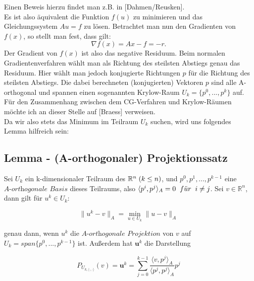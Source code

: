 Einen Beweis hierzu findet man z.B. in [Dahmen/Reusken].\\
Es ist also äquivalent die Funktion $f(u)$ zu minimieren und das Gleichungssystem $Au = f$ zu lösen. Betrachtet man nun den Gradienten von $f(x)$, so stellt man fest, dass gilt:
\begin{equation}
\nabla f(x) = Ax - f = -r.
\end{equation}
Der Gradient von $f(x)$ ist also das negative Residuum. Beim normalen Gradientenverfahren wählt man als Richtung des steilsten Abstiegs genau das Residuum. Hier wählt man jedoch konjugierte Richtungen $p$ für die Richtung des steilsten Abstiegs. Die dabei berechneten (konjugierten) Vektoren $p$ sind alle A-orthogonal und spannen einen sogenannten Krylow-Raum $U_{k} = \{p^{0},...,p^{k}\}$ auf. Für den Zusammenhang zwischen dem CG-Verfahren und Krylow-Räumen möchte ich an dieser Stelle auf [Braess] verweisen.\\
Da wir also stets das Minimum im Teilraum $U_{k}$ suchen, wird uns folgendes Lemma hilfreich sein:


\subsection{Lemma - (A-orthogonaler) Projektionssatz}\label{s.Projektionssatz}

Sei $U_{k}$ ein k-dimensionaler Teilraum des $\mathbb{R}^{n} \hspace{1mm} (k \le n)$, und $p^{0}, p^{1},...,p^{k-1}$ eine $\textit{A-orthogonale Basis}$ dieses Teilraums, also $\langle p^{i}, p^{j} \rangle _{A} = 0 \hspace{2mm} f\ddot{u}r \hspace{2mm} i \ne j$. Sei $v \in \mathbb{R}^{n}$, dann gilt für $u^{k} \in U_{k}$:

\begin{equation}
\|u^{k} - v\|_{A} = \underset{u \in U_{k}}{\min} \|u - v\|_{A}
\end{equation}

genau dann, wenn $u^{k}$ die $\textit{A-orthogonale Projektion}$ von $v$ auf $U_{k} = span\{p^{0},...,p^{k-1}\}$ ist. Außerdem hat $\textbf{u}^{k}$ die Darstellung

\begin{equation}
P_{U_{k,\langle \cdot,\cdot \rangle}}(v) = \textbf{u}^{k} = \sum_{j=0}^{k-1} \frac {\langle v, p^{j} \rangle _{A}} {\langle p^{j}, p^{j} \rangle _{A}} p^{j}
\end{equation}

